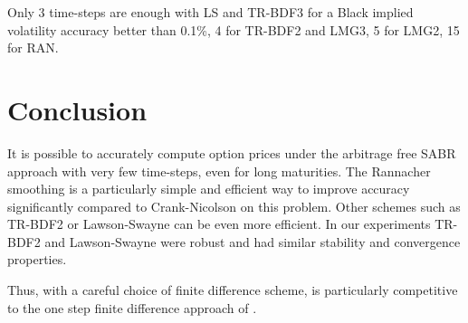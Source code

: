 \documentclass[]{rAMF2e}
\begin{document}
Only 3 time-steps are enough with LS and TR-BDF3 for a Black implied volatility accuracy better than 0.1\%, 4 for TR-BDF2 and LMG3, 5 for LMG2, 15 for RAN. 

\section{Conclusion}
It is possible to accurately compute option prices under the arbitrage free SABR approach with very few time-steps, even for long maturities. The Rannacher smoothing is a particularly simple and efficient way to improve accuracy significantly compared to Crank-Nicolson on this problem. Other schemes such as TR-BDF2 or Lawson-Swayne can be even more efficient. In our experiments TR-BDF2 and Lawson-Swayne were robust and had similar stability and convergence properties.


Thus, with a careful choice of finite difference scheme, \citep{hagan2013arbitrage} is particularly competitive to the one step finite difference approach of \citep{andreasen2011zabr}.


%

\newpage
\appendix
\end{document}
